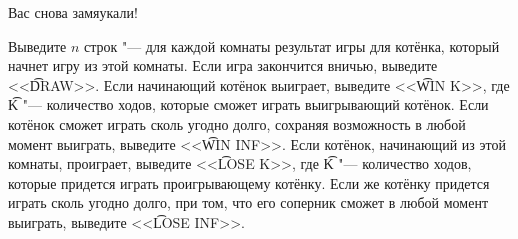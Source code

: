 \begin{problem}{Вас снова замяукали!}
\OutputFile

Выведите $n$ строк "--- для каждой комнаты результат игры для котёнка, 
который начнет игру из этой комнаты. Если игра закончится вничью,
выведите <<\t{DRAW}>>. Если начинающий котёнок выиграет, выведите
<<\t{WIN K}>>, где \t{K} "--- количество ходов, которые сможет 
играть выигрывающий котёнок. Если котёнок сможет играть сколь угодно долго,
сохраняя возможность в любой момент выиграть, выведите <<\t{WIN INF}>>.
Если котёнок, начинающий из этой комнаты, проиграет, выведите
<<\t{LOSE K}>>, где \t{K} "--- количество ходов, которые
придется играть проигрывающему котёнку. Если же котёнку придется играть
сколь угодно долго, при том, что его соперник сможет в любой момент выиграть,
выведите <<\t{LOSE INF}>>.

\Examples

\begin{example}
%
%
%
\end{example}

\end{problem}
